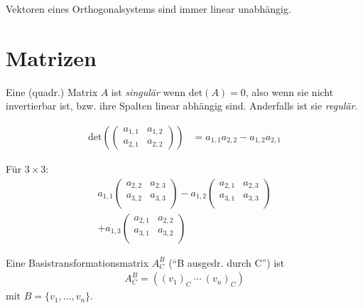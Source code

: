 \documentclass{article}
\begin{document}
\begin{multicols}{2}
Vektoren eines Orthogonalsystems sind immer linear unabhängig.

\section*{Matrizen}

Eine (quadr.) Matrix $A$ ist \emph{singulär} wenn $\text{det}(A) = 0$, also wenn sie nicht invertierbar ist, bzw. ihre Spalten linear abhängig sind. Anderfalls ist sie \emph{regulär}.

\begin{align*}
    \text{det}\left(\begin{pmatrix*}
        a_{1,1} & a_{1,2} \\
        a_{2,1} & a_{2,2}
    \end{pmatrix*}\right) &= a_{1,1}a_{2,2} - a_{1,2}a_{2,1}
\end{align*}

Für $3 \times 3$:
\begin{align*}
    a_{1,1}\begin{pmatrix*}
        a_{2,2} & a_{2,3} \\
        a_{3,2} & a_{3,3} \\
    \end{pmatrix*}
    - a_{1,2}\begin{pmatrix*}
        a_{2,1} & a_{2,3} \\
        a_{3,1} & a_{3,3} \\
    \end{pmatrix*}\\
    + a_{1,3}\begin{pmatrix*}
        a_{2,1} & a_{2,2} \\
        a_{3,1} & a_{3,2} \\
    \end{pmatrix*}
\end{align*}

Eine Basistransformationsmatrix $A_C^B$ (\enquote{B ausgedr. durch C}) ist
\begin{align*}
    A_C^B = \left((v_1)_C\ \cdots\ (v_n)_C\right)
\end{align*}
mit $B = \{ v_1, \ldots, v_n \}$.


\end{multicols}
\end{document}
